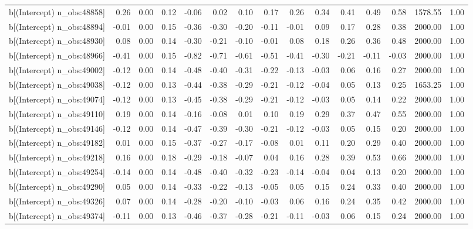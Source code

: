 \begin{table}[ht]
\begin{tabular}{rrrrrrrrrrrrrrr}
  b[(Intercept) n\_obs:48858] & 0.26 & 0.00 & 0.12 & -0.06 & 0.02 & 0.10 & 0.17 & 0.26 & 0.34 & 0.41 & 0.49 & 0.58 & 1578.55 & 1.00 \\ 
  b[(Intercept) n\_obs:48894] & -0.01 & 0.00 & 0.15 & -0.36 & -0.30 & -0.20 & -0.11 & -0.01 & 0.09 & 0.17 & 0.28 & 0.38 & 2000.00 & 1.00 \\ 
  b[(Intercept) n\_obs:48930] & 0.08 & 0.00 & 0.14 & -0.30 & -0.21 & -0.10 & -0.01 & 0.08 & 0.18 & 0.26 & 0.36 & 0.48 & 2000.00 & 1.00 \\ 
  b[(Intercept) n\_obs:48966] & -0.41 & 0.00 & 0.15 & -0.82 & -0.71 & -0.61 & -0.51 & -0.41 & -0.30 & -0.21 & -0.11 & -0.03 & 2000.00 & 1.00 \\ 
  b[(Intercept) n\_obs:49002] & -0.12 & 0.00 & 0.14 & -0.48 & -0.40 & -0.31 & -0.22 & -0.13 & -0.03 & 0.06 & 0.16 & 0.27 & 2000.00 & 1.00 \\ 
  b[(Intercept) n\_obs:49038] & -0.12 & 0.00 & 0.13 & -0.44 & -0.38 & -0.29 & -0.21 & -0.12 & -0.04 & 0.05 & 0.13 & 0.25 & 1653.25 & 1.00 \\ 
  b[(Intercept) n\_obs:49074] & -0.12 & 0.00 & 0.13 & -0.45 & -0.38 & -0.29 & -0.21 & -0.12 & -0.03 & 0.05 & 0.14 & 0.22 & 2000.00 & 1.00 \\ 
  b[(Intercept) n\_obs:49110] & 0.19 & 0.00 & 0.14 & -0.16 & -0.08 & 0.01 & 0.10 & 0.19 & 0.29 & 0.37 & 0.47 & 0.55 & 2000.00 & 1.00 \\ 
  b[(Intercept) n\_obs:49146] & -0.12 & 0.00 & 0.14 & -0.47 & -0.39 & -0.30 & -0.21 & -0.12 & -0.03 & 0.05 & 0.15 & 0.20 & 2000.00 & 1.00 \\ 
  b[(Intercept) n\_obs:49182] & 0.01 & 0.00 & 0.15 & -0.37 & -0.27 & -0.17 & -0.08 & 0.01 & 0.11 & 0.20 & 0.29 & 0.40 & 2000.00 & 1.00 \\ 
  b[(Intercept) n\_obs:49218] & 0.16 & 0.00 & 0.18 & -0.29 & -0.18 & -0.07 & 0.04 & 0.16 & 0.28 & 0.39 & 0.53 & 0.66 & 2000.00 & 1.00 \\ 
  b[(Intercept) n\_obs:49254] & -0.14 & 0.00 & 0.14 & -0.48 & -0.40 & -0.32 & -0.23 & -0.14 & -0.04 & 0.04 & 0.13 & 0.20 & 2000.00 & 1.00 \\ 
  b[(Intercept) n\_obs:49290] & 0.05 & 0.00 & 0.14 & -0.33 & -0.22 & -0.13 & -0.05 & 0.05 & 0.15 & 0.24 & 0.33 & 0.40 & 2000.00 & 1.00 \\ 
  b[(Intercept) n\_obs:49326] & 0.07 & 0.00 & 0.14 & -0.28 & -0.20 & -0.10 & -0.03 & 0.06 & 0.16 & 0.24 & 0.35 & 0.42 & 2000.00 & 1.00 \\ 
  b[(Intercept) n\_obs:49374] & -0.11 & 0.00 & 0.13 & -0.46 & -0.37 & -0.28 & -0.21 & -0.11 & -0.03 & 0.06 & 0.15 & 0.24 & 2000.00 & 1.00 \\ 

\end{tabular}
\end{table}
